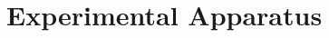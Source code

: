 \chapter{Experimental Apparatus}
\label{chap:Detector}
\begin{comment}
\section{CMS Detector}
The aim of a particle detector is to count the particles produced that pass through it after being produced in a collision or a decay - an ``event'', to visualise their tracks, to measure their energies and momenta, to record time-of-flight and to identify their identity. The exact position where the event occurs is known as the interaction point. It is neccessary to know the mass and momentum of the particles to identify them. The mass can be found by measuring either the velocity or the energy and the momentum. Depending on the type of the particles and forces to be studied, various detectors have been designed.

In particle physics, a hermetic detector, also known as a 4$\pi$ detector, is a particle detector which is designed to observe all possible decay products of an interaction between subatomic particles in a collider. It covers a large area around the interaction point and  consists of layers of sub-detectors each specialising in a particular type of particle or property. They are typically cylindrical having different types of detectors wrapped around each other. These are known as hermetic because their construction is such that the motion of particles is ceased at the boundaries of the chamber and the particles donot move beyond the seals. These detectors cover solid angle nearly of 4$\pi$ steradians around the interaction point and hence are named as ``4$\pi$'' detectors.

The first 4$\pi$ detector was the ``Mark I'' at the Stanford Linear Accelerator Center (SLAC) which resulted in the discoveries of J/$\psi$ particle and $\tau$ lepton. Its basic design has been used for all modern collider detectors. Prior to the building of the Mark I, it was thought that most particle decay products would have relatively low transverse momentum (i.e. momentum perpendicular to the beamline), so that detectors could cover this area only. However, it was learnt at the Mark I and subsequent experiments that the most fundamental particle interactions at colliders involve very large exchanges of energy and therefore involve large transverse momenta. So the large angular coverage is taken into account for modern particle physics.


\end{comment}
